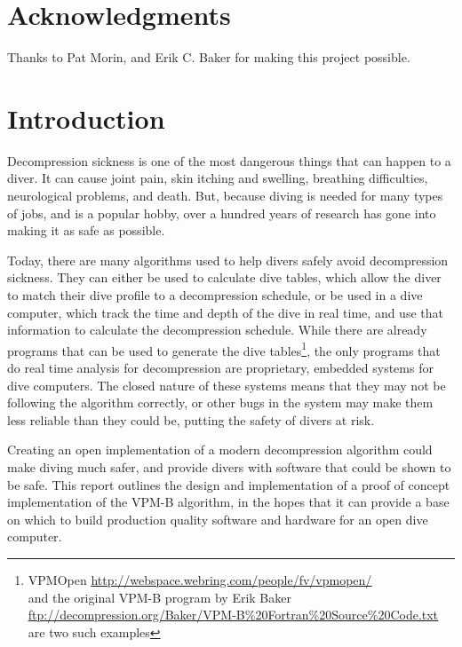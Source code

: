 \documentclass[12pt]{article}
\begin{document}
\newpage

\section*{Acknowledgments}
Thanks to Pat Morin, and Erik C. Baker for making this project possible.

\newpage

\setcounter{tocdepth}{3}
\tableofcontents
\listofalgorithms

\newpage

\section{Introduction}

 Decompression sickness is one of the most dangerous things that can happen to a diver. It can cause joint pain,
 skin itching and swelling, breathing difficulties, neurological problems, and death. But, because diving
 is needed for many types of jobs, and is a popular hobby, over a hundred years of research has gone into making
 it as safe as possible\cite{haldane07}.

 Today, there are many algorithms used to help divers safely avoid decompression sickness. They can either be
 used to calculate dive tables, which allow the diver to match their dive profile to a decompression schedule,
 or be used in a dive computer, which track the time and depth of the dive in real time, and use that information
 to calculate the decompression schedule. While there are already programs that can be used to generate the
 dive tables\footnote{VPMOpen {\color{blue}\uline{\href{http://webspace.webring.com/people/fv/vpmopen/}{http://webspace.webring.com/people/fv/vpmopen/}}}\\ and the original VPM-B program by Erik Baker \\{\color{blue}\uline{\href{ftp://decompression.org/Baker/VPM-B\%20Fortran\%20Source\%20Code.txt}{ftp://decompression.org/Baker/VPM-B\%20Fortran\%20Source\%20Code.txt}}} are two such examples}, the only programs that do real time analysis for decompression are proprietary,
embedded systems for dive computers. The closed nature of these systems means that they may not be following
the algorithm correctly, or other bugs in the system may make them less reliable than they could be, putting
the safety of divers at risk.

Creating an open implementation of a modern decompression algorithm could make diving much safer, and
provide divers with software that could be shown to be safe. This report outlines the design and implementation
of a proof of concept implementation of the VPM-B algorithm, in the hopes that it can provide a base on
which to build production quality software and hardware for an open dive computer.
\end{document}
